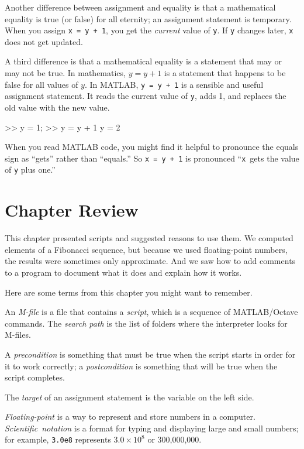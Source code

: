 
Another difference between assignment and equality is that a mathematical equality is true (or false) for all eternity;
an assignment statement is temporary.
When you assign \lstinline{x = y + 1}, you get the
\emph{current} value of \lstinline{y}.  If \lstinline{y} changes later, \lstinline{x}
does not get updated.

A third difference is that a mathematical equality is a statement that
may or may not be true.  In mathematics, $y = y+1$ is a statement that
happens to be false for all values of $y$.
In MATLAB, \lstinline{y = y + 1} is a sensible and useful assignment statement.
It reads the current value of \lstinline{y}, adds 1, and replaces the old value with the new value.

\begin{code}
>> y = 1;
>> y = y + 1
y = 2
\end{code}

When you read MATLAB code, you might find it helpful to pronounce
the equals sign as ``gets'' rather than ``equals.''  So \lstinline{x = y + 1}
is pronounced ``\lstinline{x}~gets the value of \lstinline{y} plus one.''

\section{Chapter Review}

This chapter presented scripts and suggested reasons to use them.  We computed elements of a Fibonacci sequence, but because we used floating-point numbers, the results were sometimes only approximate.
And we saw how to add comments to a program to document what it does and explain how it works.

Here are some terms from this chapter you might want to remember.

An \emph{M-file} is a file that contains a \emph{script}, which is a sequence of MATLAB/Octave commands.
The \emph{search path} is the list of folders where the interpreter looks for
M-files.

A \emph{precondition} is something that must be true when the script
starts in order for it to work correctly; a \emph{postcondition} is something that will be true when the script completes.

The \emph{target} of an assignment statement is the variable on the left side.

\emph{Floating-point} is a way to represent and store numbers in a computer.
\mbox{\emph{Scientific notation}} is a format for typing and displaying large
and small numbers; for example, \lstinline{3.0e8} represents $3.0 \times 10^8$
or 300,000,000.

